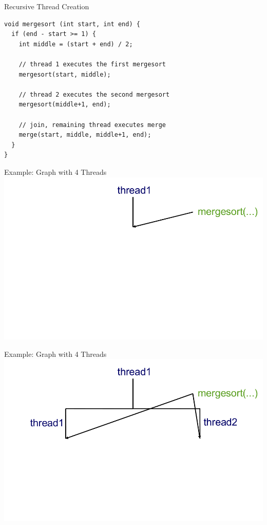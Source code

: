 \begin{frame}[fragile]{Recursive Thread Creation}
\begin{lstlisting}
void mergesort (int start, int end) {
  if (end - start >= 1) {
    int middle = (start + end) / 2;

    // thread 1 executes the first mergesort
    mergesort(start, middle);

    // thread 2 executes the second mergesort
    mergesort(middle+1, end);

    // join, remaining thread executes merge
    merge(start, middle, middle+1, end);
  }
}
\end{lstlisting}
\end{frame}

\begin{frame}{Example: Graph with 4 Threads}
  \includegraphics[width=\textwidth]{figures/thread-1}
\end{frame}

\begin{frame}{Example: Graph with 4 Threads}
  \includegraphics[width=\textwidth]{figures/thread-2}
\end{frame}

